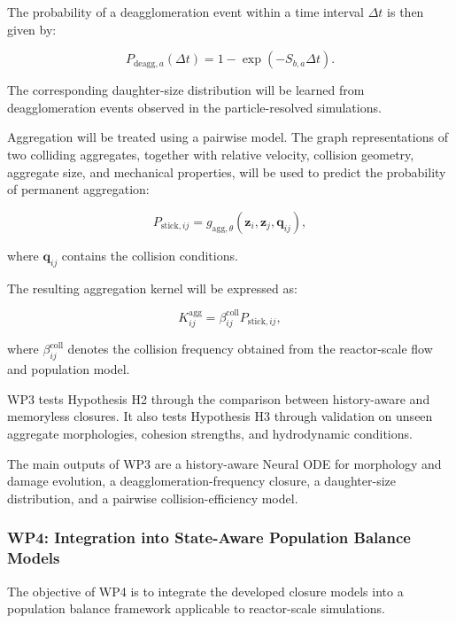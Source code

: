 \documentclass[11pt,a4paper,twoside]{scrartcl}
\begin{document}
The probability of a deagglomeration event within a time interval $\Delta t$ is then given by:

\begin{equation}
	P_{\mathrm{deagg},a}
	\left(
	\Delta t
	\right)
	=
	1
	-
	\exp
	\left(
	-S_{b,a}\Delta t
	\right).
\end{equation}

The corresponding daughter-size distribution will be learned from deagglomeration events observed in the particle-resolved simulations.

Aggregation will be treated using a pairwise model. The graph representations of two colliding aggregates, together with relative velocity, collision geometry, aggregate size, and mechanical properties, will be used to predict the probability of permanent aggregation:

\begin{equation}
	P_{\mathrm{stick},ij}
	=
	g_{\mathrm{agg},\theta}
	\left(
	\mathbf{z}_i,
	\mathbf{z}_j,
	\mathbf{q}_{ij}
	\right),
\end{equation}

where $\mathbf{q}_{ij}$ contains the collision conditions.

The resulting aggregation kernel will be expressed as:

\begin{equation}
	K_{ij}^{\mathrm{agg}}
	=
	\beta_{ij}^{\mathrm{coll}}
	P_{\mathrm{stick},ij},
\end{equation}

where $\beta_{ij}^{\mathrm{coll}}$ denotes the collision frequency obtained from the reactor-scale flow and population model.

WP3 tests Hypothesis H2 through the comparison between history-aware and memoryless closures. It also tests Hypothesis H3 through validation on unseen aggregate morphologies, cohesion strengths, and hydrodynamic conditions.

The main outputs of WP3 are a history-aware Neural ODE for morphology and damage evolution, a deagglomeration-frequency closure, a daughter-size distribution, and a pairwise collision-efficiency model.


\subsubsection{WP4: Integration into State-Aware Population Balance Models}

The objective of WP4 is to integrate the developed closure models into a population balance framework applicable to reactor-scale simulations.
\end{document}
